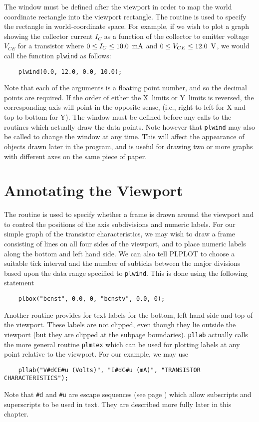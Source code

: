 The window must be defined after the viewport in order to map the world
coordinate rectangle into the viewport rectangle. The routine
 is used to specify the rectangle in world-coordinate space.
For example, if we wish to plot a graph showing the collector current
$I_C$ as a function of the collector to emitter voltage $V_{CE}$ for a
transistor where $0\le I_C\le 10.0\mbox{\, mA}$ and $0\le V_{CE}\le
12.0\mbox{\, V}$, we would call the function {\tt plwind} as follows:
\begin{verbatim}
    plwind(0.0, 12.0, 0.0, 10.0);
\end{verbatim}
Note that each of the arguments is a floating point number, and so the
decimal points are required. If the order of either the X~limits or
Y~limits is reversed, the corresponding axis will point in the opposite
sense, (i.e., right to left for X and top to bottom for Y). The window
must be defined before any calls to the routines which actually draw the
data points. Note however that {\tt plwind} may also be called to change
the window at any time. This will affect the appearance of objects drawn
later in the program, and is useful for drawing two or more graphs with
different axes on the same piece of paper.


\section {Annotating the Viewport} \label{annotate}

The routine  is used to specify whether a frame is drawn around
the viewport and to control the positions of the axis subdivisions and
numeric labels. For our simple graph of the transistor characteristics, 
we may wish to draw a frame consisting of lines on all four sides of the
viewport, and to place numeric labels along the bottom and left hand side.
We can also tell PLPLOT to choose a suitable tick interval and
the number of subticks between the major divisions based upon the
data range specified to {\tt plwind}. This is done using the following
statement
\begin{verbatim}
    plbox("bcnst", 0.0, 0, "bcnstv", 0.0, 0);
\end{verbatim}
Another routine  provides for text labels for the bottom, 
left hand side and top of the viewport. These labels are not clipped, 
even though they lie outside the viewport (but they are clipped at the
subpage boundaries). {\tt pllab} actually calls the more general routine
{\tt plmtex} which can be used for plotting labels at any point relative
to the viewport. For our example, we may use
\begin{verbatim}
    pllab("V#dCE#u (Volts)", "I#dC#u (mA)", "TRANSISTOR CHARACTERISTICS");
\end{verbatim}
Note that \verb+#d+ and \verb+#u+ are escape sequences (see page
\pageref{escape}) which allow subscripts and superscripts to be used in
text.  They are described more fully later in this chapter.

